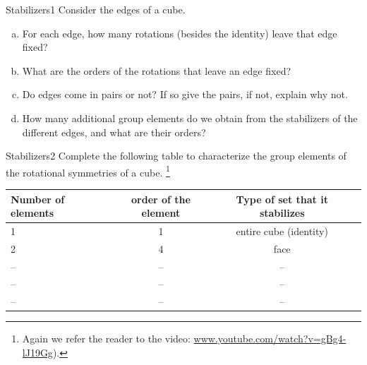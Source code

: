 \begin{exercise}{Stabilizers1}
Consider the edges of a cube.
\begin{enumerate}[(a)]
\item
For each edge, how many rotations (besides the identity) leave that edge fixed?
\item
What are the orders of the rotations that leave an edge fixed?
\item
Do edges come in pairs or not?  If so give the pairs, if not, explain why not.
\item
How many additional group elements do we obtain from the stabilizers of the different edges, and what are their orders? 
\end{enumerate}
\end{exercise}
\begin{exercise}{Stabilizers2}
Complete the following table to characterize the group elements of the rotational symmetries of a cube.
\footnote{Again we refer the reader to the video: \url{www.youtube.com/watch?v=gBg4-lJ19Gg}).}

\begin{tabular}{| l |c|c| r |}\hline
  Number of elements & order of the element & Type of set that it stabilizes \\ \hline
  1 & 1 & entire cube (identity) \\ \hline
  2 & 4 & face \\ \hline
 -- & -- & -- \\ \hline
-- & -- & -- \\ \hline
-- & -- & -- \\ \hline
\end{tabular}
\end{exercise}
